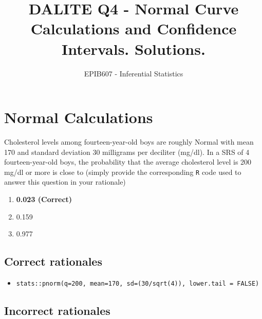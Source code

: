 \documentclass[letterpaper,9pt,twoside,printwatermark=false]{pinp}
\title{DALITE Q4 - Normal Curve Calculations and Confidence Intervals.
Solutions.}
\author[a]{EPIB607 - Inferential Statistics}
\affil[a]{Fall 2018, McGill University}
\providecommand{\tightlist}{%
  \setlength{\itemsep}{0pt}\setlength{\parskip}{0pt}}
\begin{document}
\verticaladjustment{-2pt}

\maketitle
\thispagestyle{firststyle}



\section{Normal Calculations}\label{normal-calculations}

Cholesterol levels among fourteen-year-old boys are roughly Normal with
mean 170 and standard deviation 30 milligrams per deciliter (mg/dl). In
a SRS of 4 fourteen-year-old boys, the probability that the average
cholesterol level is 200 mg/dl or more is close to (simply provide the
corresponding \texttt{R} code used to answer this question in your
rationale)

\begin{enumerate}
\def\labelenumi{\alph{enumi}.}
\tightlist
\item
  \textbf{0.023 (Correct)}
\item
  0.159
\item
  0.977
\end{enumerate}

\subsection{Correct rationales}\label{correct-rationales}

\begin{itemize}
\tightlist
\item
  \texttt{stats::pnorm(q=200,\ mean=170,\ sd=(30/sqrt(4)),\ lower.tail\ =\ FALSE)}
\end{itemize}

\subsection{Incorrect rationales}\label{incorrect-rationales}
\end{document}
